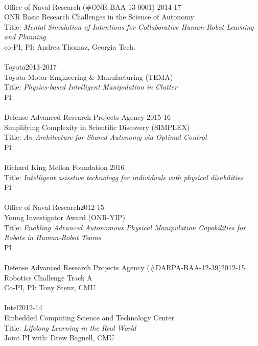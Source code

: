 \\
Office of Naval Research (\#ONR BAA 13-0001) \hfill 2014-17\\
ONR Basic Research Challenges in the Science of Autonomy\\
Title: \textit{Mental Simulation of Intentions for Collaborative Human-Robot Learning and Planning}\\
co-PI, PI: Andrea Thomaz, Georgia Tech.	\\
\\
Toyota\hfill 2013-2017\\
Toyota Motor Engineering \& Manufacturing (TEMA)\\
Title: \textit{Physics-based Intelligent Manipulation in Clutter}\\
PI\\
\\
Defense Advanced Research Projects Agency \hfill 2015-16\\
Simplifying Complexity in Scientific Discovery (SIMPLEX)\\
Title: \textit{An Architecture for Shared Autonomy via Optimal Control}\\
PI\\
\\
Richard King Mellon Foundation \hfill 2016\\
Title: \textit{Intelligent asisstive technology for individuals with physical disabilities}\\
PI\\
\\
Office of Naval Research\hfill 2012-15\\
Young Investigator Award (ONR-YIP)\\
Title: \textit{Enabling Advanced Autonomous Physical Manipulation Capabilities for Robots in Human-Robot Teams}\\
PI\\
\\
Defense Advanced Research Projects Agency (\#DARPA-BAA-12-39)\hfill 2012-15\\
Robotics Challenge Track A\\
Co-PI, PI: Tony Stenz, CMU\\
\\
Intel\hfill 2012-14\\
Embedded Computing Science and Technology Center\\
Title: \textit{Lifelong Learning in the Real World}\\
Joint PI with: Drew Bagnell, CMU\\
\\
